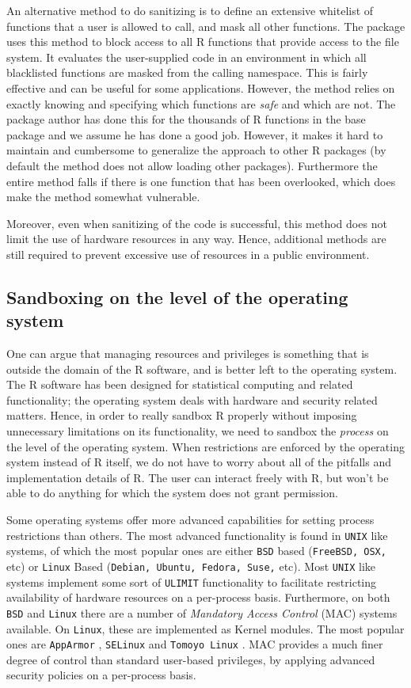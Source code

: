 \documentclass[article]{jss}
\newcommand{\R}{\textsf{R}\xspace}
\newcommand{\AppArmor}{\texttt{AppArmor}\xspace}
\newcommand{\Linux}{\texttt{Linux}\xspace}
\newcommand{\ULIMIT}{\texttt{ULIMIT}\xspace}
\begin{document}
An alternative method to do sanitizing is to define an extensive whitelist of
functions that a user is allowed to call, and mask all other functions. The
 \citep{sandboxR} package uses this method to block access
to all \R functions that provide access to the file system. It evaluates
the user-supplied code in an environment in which all blacklisted
functions are masked from the calling namespace. This is fairly effective and
can be useful for some applications. However, the method relies on exactly
knowing and specifying which functions are \emph{safe} and which are not. The
package author has done this for the thousands of \R functions in the
base package and we assume he has done a good job. However, it makes it hard to
maintain and cumbersome to generalize the approach to other \R packages (by
default the method does not allow loading other packages). Furthermore the
entire method falls if there is one function that has been
overlooked, which does make the method somewhat vulnerable.

Moreover, even when sanitizing of the code is successful, this method does not
limit the use of hardware resources in any way. Hence, additional methods are
still required to prevent excessive use of resources in a public environment.

\subsection{Sandboxing on the level of the operating system}

One can argue that managing resources and privileges is something that
is outside the domain of the \R software, and is better left to the
operating system. The \R software has been designed for statistical
computing and related functionality; the operating system deals with hardware
and security related matters. Hence, in order to really sandbox \R
properly without imposing unnecessary limitations on its functionality, we need
to sandbox the \emph{process} on the level of the operating system. When
restrictions are enforced by the operating system instead of \R
itself, we do not have to worry about all of the pitfalls and implementation
details of \R. The user can interact freely with \R, but
won't be able to do anything for which the system does not grant permission. 

Some operating systems offer more advanced capabilities for setting process
restrictions than others. The most advanced functionality is found in
\texttt{UNIX} like systems, of which the most popular ones are either
\texttt{BSD} based (\texttt{FreeBSD, OSX,} etc) or \Linux Based
(\texttt{Debian, Ubuntu, Fedora, Suse,} etc). Most \texttt{UNIX} like
systems implement some sort of \ULIMIT functionality to facilitate
restricting availability of hardware resources on a per-process basis.
Furthermore, on both \texttt{BSD} and \Linux there are a number of
\emph{Mandatory Access Control} (MAC) systems available. On \Linux,
these are implemented as Kernel modules. The most popular ones are \AppArmor
\citep{apparmor}, \texttt{SELinux} \citep{selinux} and \texttt{Tomoyo Linux}
\citep{tomoyo}. MAC provides a much finer degree of control than standard
user-based privileges, by applying advanced security policies on a per-process
basis.
\end{document}
